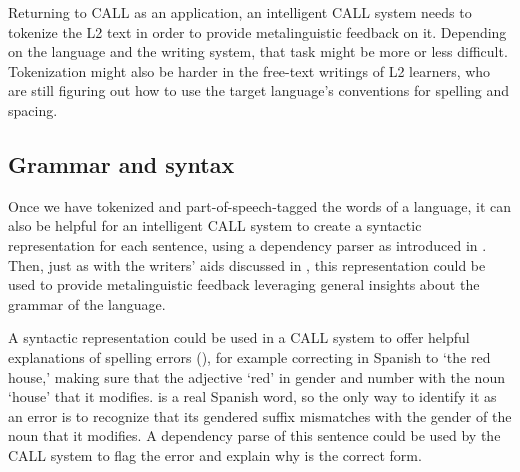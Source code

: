 Returning to CALL as an application, an intelligent CALL system needs to tokenize the L2 text in order to provide metalinguistic feedback on it.  Depending on the language and the writing system, that task might be more or less difficult.  Tokenization might also be harder in the free-text writings of L2 learners, who are still figuring out how to use the target language's conventions for spelling and spacing.





\subsection{Grammar and syntax}

Once we have tokenized and part-of-speech-tagged the words of a language, it can also be helpful for an intelligent CALL system to create a syntactic representation for each sentence, using a dependency parser as introduced in .  Then, just as with the writers' aids discussed in , this representation could be used to provide metalinguistic feedback leveraging general insights about the grammar of the language. 

A syntactic representation could be used in a CALL system to offer helpful explanations of spelling errors (), for example correcting  in Spanish to  `the red house,' making sure that the adjective  `red'  in gender and number with the noun  `house' that it modifies.   is a real Spanish word, so the only way to identify it as an error is to recognize that its gendered suffix  mismatches with the gender of the noun  that it modifies. A dependency parse of this sentence could be used by the CALL system to flag the error and explain why  is the correct form.    

